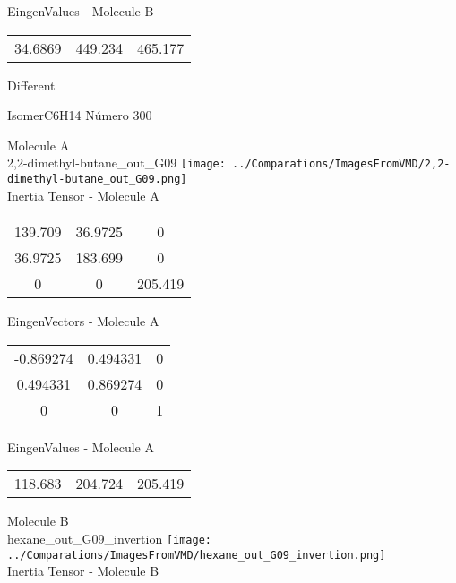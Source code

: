 \begin{multicols}{2}
\begin{center}
\vtab
 EingenValues - Molecule B     \\
\vtab
\begin{tabular}{|c c c|}
34.6869	 & 	449.234	 & 	465.177	 \\
\end{tabular}

\end{center}
\end{multicols}
\begin{center}
\vtab
\vtab
\textcolor{NavyBlue}{\Large Different}
\end{center}

 \newpage

\vtab[-2cm]
\begin{center}
{\large IsomerC6H14 \tab Número 300}
\end{center}
\begin{multicols}{2}
\begin{center}

Molecule A \\ 
2,2-dimethyl-butane\_out\_G09
\texttt{[image: ../Comparations/ImagesFromVMD/2,2-dimethyl-butane\_out\_G09.png]}
\\
Inertia Tensor - Molecule A \\
\vtab

\begin{tabular}{|c c c|}
139.709	 & 	36.9725	 & 	0	 \\
36.9725	 & 	183.699	 & 	0	 \\
0	 & 	0	 & 	205.419
\end{tabular}

\vtab
 EingenVectors - Molecule A     \\
\vtab
\begin{tabular}{|c c c|}
-0.869274	 & 	0.494331	 & 	0	 \\
0.494331	 & 	0.869274	 & 	0	 \\
0	 & 	0	 & 	1
\end{tabular}

\vtab
 EingenValues - Molecule A     \\
\vtab
\begin{tabular}{|c c c|}
118.683	 & 	204.724	 & 	205.419	 \\
\end{tabular}
\columnbreak

Molecule B \\ 
hexane\_out\_G09\_invertion
\texttt{[image: ../Comparations/ImagesFromVMD/hexane\_out\_G09\_invertion.png]}
\\
Inertia Tensor - Molecule B \\
\vtab


\end{center}
\end{multicols}
